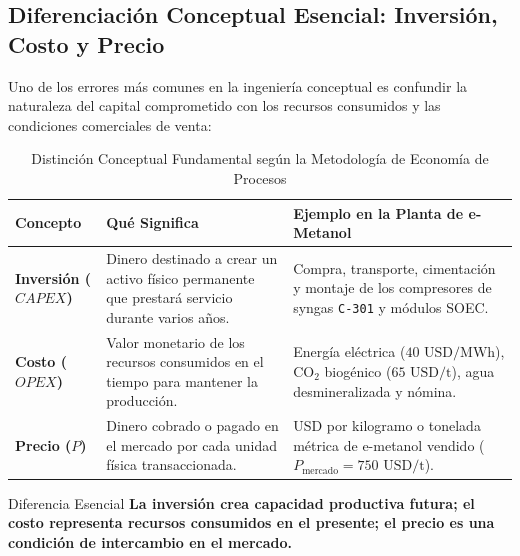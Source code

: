 \documentclass[11pt,letterpaper]{article}
\begin{document}
\subsection{Diferenciación Conceptual Esencial: Inversión, Costo y Precio}
Uno de los errores más comunes en la ingeniería conceptual es confundir la naturaleza del capital comprometido con los recursos consumidos y las condiciones comerciales de venta:

\begin{table}[htbp]
    \centering
    \small
    \caption{Distinción Conceptual Fundamental según la Metodología de Economía de Procesos}
    \begin{tabularx}{\textwidth}{l X X}
        \toprule
        \rowcolor{tableheader}
        \textbf{\color{white}Concepto} & \textbf{\color{white}Qué Significa} & \textbf{\color{white}Ejemplo en la Planta de e-Metanol} \\
        \midrule
        \textbf{Inversión ($CAPEX$)} & Dinero destinado a crear un activo físico permanente que prestará servicio durante varios años. & Compra, transporte, cimentación y montaje de los compresores de syngas \texttt{C-301} y módulos SOEC. \\
        \rowcolor{tablerowgray}
        \textbf{Costo ($OPEX$)} & Valor monetario de los recursos consumidos en el tiempo para mantener la producción. & Energía eléctrica ($40\text{ USD/MWh}$), $\text{CO}_2$ biogénico ($65\text{ USD/t}$), agua desmineralizada y nómina. \\
        \textbf{Precio ($P$)} & Dinero cobrado o pagado en el mercado por cada unidad física transaccionada. & USD por kilogramo o tonelada métrica de e-metanol vendido ($P_{\text{mercado}} = 750\text{ USD/t}$). \\
        \bottomrule
    \end{tabularx}
\end{table}

\begin{conceptbox}{Diferencia Esencial}
\textbf{La inversión crea capacidad productiva futura; el costo representa recursos consumidos en el presente; el precio es una condición de intercambio en el mercado.}
\end{conceptbox}
\end{document}
